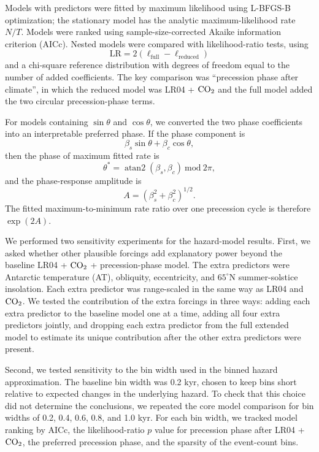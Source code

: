 \documentclass[11pt]{article}
\begin{document}
Models with predictors were fitted by maximum likelihood using L-BFGS-B optimization; the stationary model has the analytic maximum-likelihood rate \(N/T\). Models were ranked using sample-size-corrected Akaike information criterion (AICc). Nested models were compared with likelihood-ratio tests, using
\[
\mathrm{LR} = 2(\ell_\mathrm{full}-\ell_\mathrm{reduced})
\]
and a chi-square reference distribution with degrees of freedom equal to the number of added coefficients. The key comparison was ``precession phase after climate'', in which the reduced model was LR04 + \(\ce{CO2}\) and the full model added the two circular precession-phase terms.

For models containing \(\sin\theta\) and \(\cos\theta\), we converted the two phase coefficients into an interpretable preferred phase. If the phase component is
\[
\beta_s\sin\theta+\beta_c\cos\theta,
\]
then the phase of maximum fitted rate is
\[
\theta^\ast = \operatorname{atan2}(\beta_s,\beta_c)\ \mathrm{mod}\ 2\pi,
\]
and the phase-response amplitude is
\[
A = (\beta_s^2+\beta_c^2)^{1/2}.
\]
The fitted maximum-to-minimum rate ratio over one precession cycle is therefore \(\exp(2A)\). 

We performed two sensitivity experiments for the hazard-model results. First, we asked whether other plausible forcings add explanatory power beyond the baseline LR04 + \(\ce{CO2}\) + precession-phase model. The extra predictors were Antarctic temperature (AT), obliquity, eccentricity, and \(65^\circ\)N summer-solstice insolation. Each extra predictor was range-scaled in the same way as LR04 and \(\ce{CO2}\). We tested the contribution of the extra forcings in three ways: adding each extra predictor to the baseline model one at a time, adding all four extra predictors jointly, and dropping each extra predictor from the full extended model to estimate its unique contribution after the other extra predictors were present.

Second, we tested sensitivity to the bin width used in the binned hazard approximation. The baseline bin width was 0.2 kyr, chosen to keep bins short relative to expected changes in the underlying hazard. To check that this choice did not determine the conclusions, we repeated the core model comparison for bin widths of 0.2, 0.4, 0.6, 0.8, and 1.0 kyr. For each bin width, we tracked model ranking by AICc, the likelihood-ratio \(p\) value for precession phase after LR04 + \(\ce{CO2}\), the preferred precession phase, and the sparsity of the event-count bins.
\end{document}
